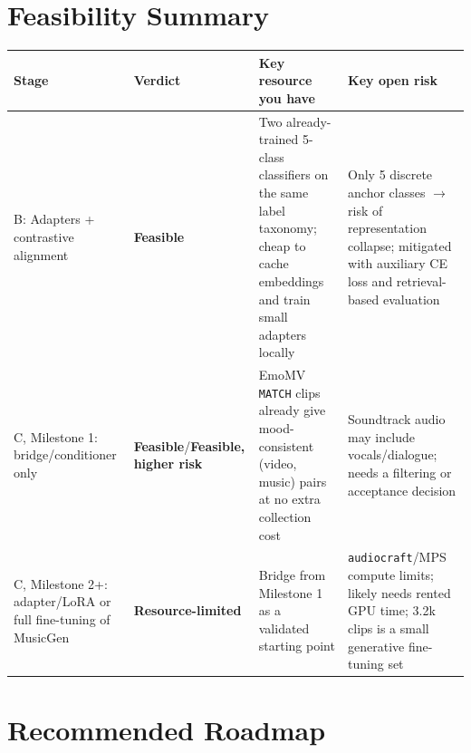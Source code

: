 \documentclass[11pt]{article}
\newcommand{\good}{\textcolor{green!50!black}{\textbf{Feasible}}}
\newcommand{\risky}{\textcolor{orange!80!black}{\textbf{Feasible, higher risk}}}
\newcommand{\hard}{\textcolor{red!70!black}{\textbf{Resource-limited}}}
\begin{document}
\section{Feasibility Summary}

\begin{center}
\begin{tabularx}{\textwidth}{@{}>{\raggedright\arraybackslash}p{2.6cm} l X X@{}}
\toprule
\textbf{Stage} & \textbf{Verdict} & \textbf{Key resource you have} & \textbf{Key open risk} \\
\midrule
B: Adapters + contrastive alignment &
\good &
Two already-trained 5-class classifiers on the same label taxonomy; cheap to cache embeddings and
train small adapters locally &
Only 5 discrete anchor classes $\to$ risk of representation collapse; mitigated with auxiliary CE
loss and retrieval-based evaluation \\
\addlinespace
C, Milestone 1: bridge/\allowbreak conditioner only &
\good/\risky &
EmoMV \texttt{MATCH} clips already give mood-consistent (video, music) pairs at no extra
collection cost &
Soundtrack audio may include vocals/dialogue; needs a filtering or acceptance decision \\
\addlinespace
C, Milestone 2+: adapter/LoRA or full fine-tuning of MusicGen &
\hard &
Bridge from Milestone 1 as a validated starting point &
\texttt{audiocraft}/MPS compute limits; likely needs rented GPU time; 3.2k clips is a small
generative fine-tuning set \\
\bottomrule
\end{tabularx}
\end{center}

\section{Recommended Roadmap}
\end{document}

